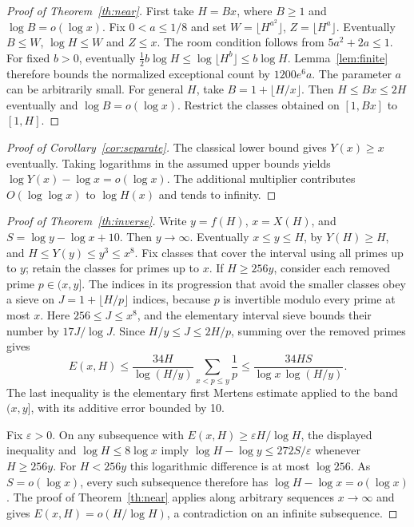 \documentclass[11pt]{article}
\begin{document}
\begin{proof}[Proof of Theorem~\ref{th:near}]
First take \(H=Bx\), where \(B\ge1\) and \(\log B=o(\log x)\).
Fix \(0<a\le 1/8\) and set \(W=\lfloor H^{a^2}\rfloor\),
\(Z=\lfloor H^a\rfloor\). Eventually \(B\le W\), \(\log H\le W\) and
\(Z\le x\). The room condition follows from \(5a^2+2a\le1\).
For fixed \(b>0\), eventually
\(\frac12 b\log H\le\log\lfloor H^b\rfloor\le b\log H\).
Lemma~\ref{lem:finite} therefore bounds the normalized exceptional count
by \(1200e^6a\). The parameter \(a\) can be arbitrarily small.
For general \(H\), take \(B=1+\lfloor H/x\rfloor\). Then \(H\le Bx\le2H\)
eventually and \(\log B=o(\log x)\). Restrict the classes obtained on
\([1,Bx]\) to \([1,H]\).
\end{proof}

\begin{proof}[Proof of Corollary~\ref{cor:separate}]
The classical lower bound gives \(Y(x)\ge x\) eventually. Taking logarithms
in the assumed upper bounds yields \(\log Y(x)-\log x=o(\log x)\).
The additional multiplier contributes \(O(\log\log x)\) to \(\log H(x)\)
and tends to infinity.
\end{proof}

\begin{proof}[Proof of Theorem~\ref{th:inverse}]
Write \(y=f(H)\), \(x=X(H)\), and \(S=\log y-\log x+10\). Then \(y\to\infty\).
Eventually \(x\le y\le H\), by \(Y(H)\ge H\), and \(H\le Y(y)\le y^3\le x^8\).
Fix classes that cover the interval using all primes up to \(y\);
retain the classes for primes up to \(x\). If \(H\ge256y\), consider
each removed prime \(p\in(x,y]\). The indices in its progression that
avoid the smaller classes obey a sieve on \(J=1+\lfloor H/p\rfloor\)
indices, because \(p\) is invertible modulo every prime at most \(x\).
Here \(256\le J\le x^8\), and the elementary interval sieve
\cite{sieve} bounds their number by \(17J/\log J\).
Since \(H/y\le J\le 2H/p\), summing over the removed primes gives
\[
 E(x,H)\le\frac{34H}{\log(H/y)}
       \sum_{x<p\le y}\frac1p
 \le\frac{34H S}{\log x\,\log(H/y)}.
\]
The last inequality is the elementary first Mertens estimate applied
to the band \((x,y]\), with its additive error bounded by 10.

Fix \(\varepsilon>0\). On any subsequence with
\(E(x,H)\ge\varepsilon H/\log H\), the displayed inequality and
\(\log H\le8\log x\) imply
\(\log H-\log y\le272 S/\varepsilon\) whenever \(H\ge256y\).
For \(H<256y\) this logarithmic difference is at most \(\log 256\).
As \(S=o(\log x)\), every such subsequence therefore has
\(\log H-\log x=o(\log x)\). The proof of Theorem~\ref{th:near}
applies along arbitrary sequences \(x\to\infty\) and gives
\(E(x,H)=o(H/\log H)\), a contradiction on an infinite subsequence.
\end{proof}
\end{document}
